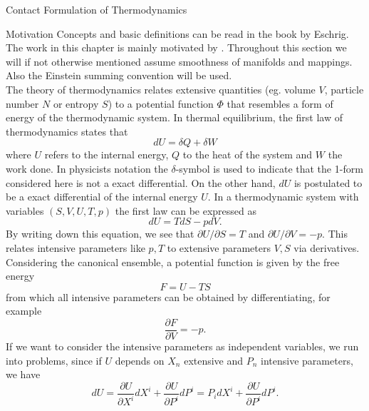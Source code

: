 \begin{section}{Contact Formulation of Thermodynamics}
\begin{subsection}{Motivation}
Concepts and basic definitions can be read in the book \cite{eschrigTopologyGeometryPhysics2011} by Eschrig. The work in this chapter is mainly motivated by \cite{mrugalaGeometricalFormulationEquilibrium1978, mrugalaContactStructureThermodynamic1991,weinholdMetricGeometryEquilibrium1975}. Throughout this section we will if not otherwise mentioned assume smoothness of manifolds and mappings. Also the Einstein summing convention will be used.\\
The theory of thermodynamics relates extensive quantities (eg. volume $V$, particle number $N$ or entropy $S$) to a potential function $\Phi$ that resembles a form of energy of the thermodynamic system. In thermal equilibrium, the first law of thermodynamics states that
\begin{equation}
	dU = \delta Q + \delta W
\end{equation}
where $U$ refers to the internal energy, $Q$ to the heat of the system and $W$ the work done. In physicists notation the $\delta$-symbol is used to indicate that the 1-form considered here is not a exact differential. On the other hand, $dU$ is postulated to be a exact differential of the internal energy $U$. In a thermodynamic system with variables $(S,V,U,T,p)$ the first law can be expressed as
\begin{equation}
	dU=TdS-pdV.
\end{equation}
By writing down this equation, we see that $\partial U/\partial S = T$ and $\partial U/\partial V=-p$. This relates intensive parameters like $p,T$ to extensive parameters $V,S$ via derivatives. Considering the canonical ensemble, a potential function is given by the free energy
\begin{equation}
	F = U-TS
\end{equation}
from which all intensive parameters can be obtained by differentiating, for example
\begin{equation}
	\frac{\partial F}{\partial V} = -p.
\end{equation}
If we want to consider the intensive parameters as independent variables, we run into problems, since if $U$ depends on $X_n$ extensive and $P_n$ intensive parameters, we have
\begin{equation}
	dU = \frac{\partial U}{\partial X^i}dX^i + \frac{\partial U}{\partial P^i}dP^i = P_idX^i + \frac{\partial U}{\partial P^i}dP^i.
\end{equation}

\end{subsection}
\end{section}
